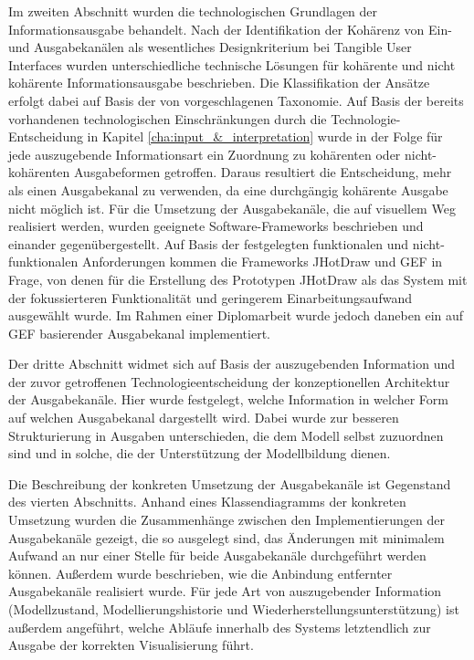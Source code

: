 Im zweiten Abschnitt wurden die technologischen Grundlagen der Informationsausgabe behandelt. Nach der Identifikation der Kohärenz von Ein- und Ausgabekanälen als wesentliches Designkriterium bei Tangible User Interfaces wurden unterschiedliche technische Lösungen für kohärente und nicht kohärente Informationsausgabe beschrieben. Die Klassifikation der Ansätze erfolgt dabei auf Basis der von \citep{Fishkin04} vorgeschlagenen Taxonomie. Auf Basis der bereits vorhandenen technologischen Einschränkungen durch die Technologie-Entscheidung in Kapitel \ref{cha:input_&_interpretation} wurde in der Folge für jede auszugebende Informationsart ein Zuordnung zu kohärenten oder nicht-kohärenten Ausgabeformen getroffen. Daraus resultiert die Entscheidung, mehr als einen Ausgabekanal zu verwenden, da eine durchgängig kohärente Ausgabe nicht möglich ist. Für die Umsetzung der Ausgabekanäle, die auf visuellem Weg realisiert werden, wurden geeignete Software-Frameworks beschrieben und einander gegenübergestellt. Auf Basis der festgelegten funktionalen und nicht-funktionalen Anforderungen kommen die Frameworks JHotDraw \citep{Gamma96} und \gls{GEF} \citep{Moore04} in Frage, von denen für die Erstellung des Prototypen JHotDraw als das System mit der fokussierteren Funktionalität und geringerem Einarbeitungsaufwand ausgewählt wurde. Im Rahmen einer Diplomarbeit \citep{Feiner08} wurde jedoch daneben ein auf \gls{GEF} basierender Ausgabekanal implementiert.

Der dritte Abschnitt widmet sich auf Basis der auszugebenden Information und der zuvor getroffenen Technologieentscheidung der konzeptionellen Architektur der Ausgabekanäle. Hier wurde festgelegt, welche Information in welcher Form auf welchen Ausgabekanal dargestellt wird. Dabei wurde zur besseren Strukturierung in Ausgaben unterschieden, die dem Modell selbst zuzuordnen sind und in solche, die der Unterstützung der Modellbildung dienen.

Die Beschreibung der konkreten Umsetzung der Ausgabekanäle ist Gegenstand des vierten Abschnitts. Anhand eines Klassendiagramms der konkreten Umsetzung wurden die Zusammenhänge zwischen den Implementierungen der Ausgabekanäle gezeigt, die so ausgelegt sind, das Änderungen mit minimalem Aufwand an nur einer Stelle für beide Ausgabekanäle durchgeführt werden können. Außerdem wurde beschrieben, wie die Anbindung entfernter Ausgabekanäle realisiert wurde. Für jede Art von auszugebender Information (Modellzustand, Modellierungshistorie und Wiederherstellungsunterstützung) ist außerdem angeführt, welche Abläufe innerhalb des Systems letztendlich zur Ausgabe der korrekten Visualisierung führt. 


